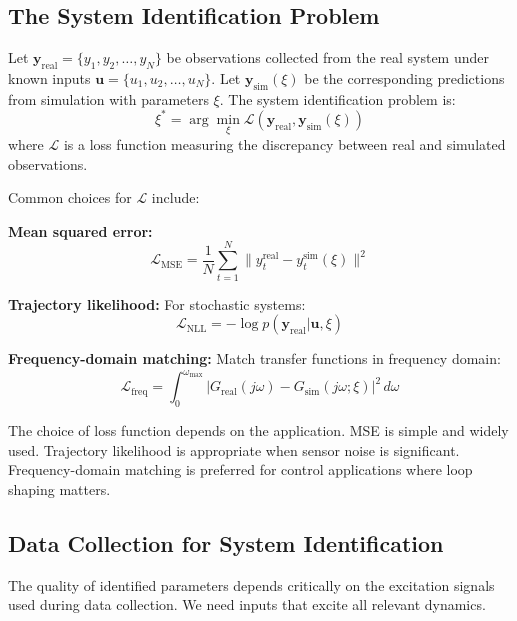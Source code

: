 \subsection{The System Identification Problem}

Let $\mathbf{y}_{\text{real}} = \{y_1, y_2, \ldots, y_N\}$ be observations collected from the real system under known inputs $\mathbf{u} = \{u_1, u_2, \ldots, u_N\}$. Let $\mathbf{y}_{\text{sim}}(\xi)$ be the corresponding predictions from simulation with parameters $\xi$. The system identification problem is:
\begin{equation}
\xi^* = \arg\min_\xi \mathcal{L}(\mathbf{y}_{\text{real}}, \mathbf{y}_{\text{sim}}(\xi))
\label{eq:sysid_objective}
\end{equation}
where $\mathcal{L}$ is a loss function measuring the discrepancy between real and simulated observations.

Common choices for $\mathcal{L}$ include:

\textbf{Mean squared error:}
\begin{equation}
\mathcal{L}_{\text{MSE}} = \frac{1}{N} \sum_{t=1}^{N} \| y_t^{\text{real}} - y_t^{\text{sim}}(\xi) \|^2
\end{equation}

\textbf{Trajectory likelihood:} For stochastic systems:
\begin{equation}
\mathcal{L}_{\text{NLL}} = -\log p(\mathbf{y}_{\text{real}} | \mathbf{u}, \xi)
\end{equation}

\textbf{Frequency-domain matching:} Match transfer functions in frequency domain:
\begin{equation}
\mathcal{L}_{\text{freq}} = \int_0^{\omega_{\max}} |G_{\text{real}}(j\omega) - G_{\text{sim}}(j\omega; \xi)|^2 \, d\omega
\end{equation}

The choice of loss function depends on the application. MSE is simple and widely used. Trajectory likelihood is appropriate when sensor noise is significant. Frequency-domain matching is preferred for control applications where loop shaping matters.

\subsection{Data Collection for System Identification}

The quality of identified parameters depends critically on the excitation signals used during data collection. We need inputs that excite all relevant dynamics.

